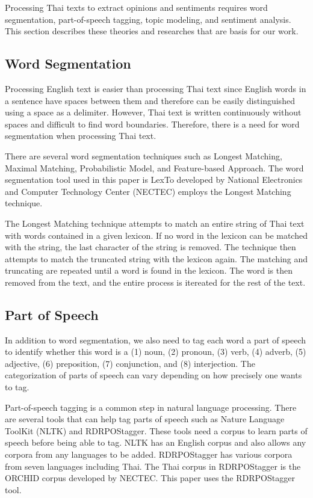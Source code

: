 Processing Thai texts to extract opinions and sentiments requires word segmentation, part-of-speech tagging, topic modeling, and sentiment analysis. This section describes these theories and researches that are basis for our work. 

\subsection{Word Segmentation}

Processing English text is easier than processing Thai text since English words in a sentence have spaces between them and therefore can be easily distinguished using a space as a delimiter. However, Thai text is written continuously without spaces and difficult to find word boundaries. Therefore, there is a need for word segmentation when processing Thai text.

There are several word segmentation techniques such as Longest Matching\cite{syllableseparator}, Maximal Matching\cite{wordsegforthai}, Probabilistic Model\cite{thaiwordfilter}, and Feature-based Approach\cite{featurethaiwordseg}. The word segmentation tool used in this paper is LexTo\cite{LexTo} developed by National Electronics and Computer Technology Center (NECTEC) employs the Longest Matching technique. 

The Longest Matching technique attempts to match an entire string of Thai text with words contained in a given lexicon. If no word in the lexicon can be matched with the string, the last character of the string is removed. The technique then attempts to match the truncated string with the lexicon again. The matching and truncating are repeated until a word is found in the lexicon. The word is then removed from the text, 
and the entire process is itereated for the rest of the text.

\subsection{Part of Speech}

In addition to word segmentation, we also need to tag each word a part of speech to identify whether this word is a (1) noun, (2) pronoun, (3) verb, (4) adverb, (5) adjective, (6) preposition, (7) conjunction, and (8) interjection. The categorization of parts of speech can vary depending on how precisely one wants to tag.

Part-of-speech tagging is a common step in natural language processing. There are several tools that can help tag parts of speech such as Nature Language ToolKit (NLTK)\cite{NLTK} and RDRPOStagger\cite{RDRPOSTagger}. These tools need a corpus to learn parts of speech before being able to tag. NLTK has an English corpus and also allows any corpora from any languages to be added. RDRPOStagger has various corpora from seven languages including Thai. The Thai corpus in RDRPOStagger is the ORCHID\cite{ORCHID} corpus developed by NECTEC. This paper uses the RDRPOStagger tool.

